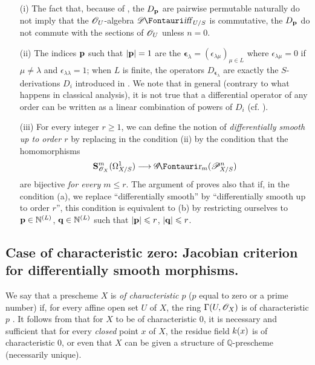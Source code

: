 \begin{remarks}[16.11.3]
\label{IV.16.11.3}
\begin{enumerate}
  \item[\rm{(i)}] The fact that, because of , the $D_\mathbf{p}$ are pairwise permutable naturally do not imply that the $\mathscr{O}_U$-algebra $\shDiff_{U/S}$ is commutative, the $D_\mathbf{p}$ do not commute with the sections of $\mathscr{O}_U$ unless $n = 0$.
  \item[\rm{(ii)}] The indices $\mathbf{p}$ such that $|\mathbf{p}| = 1$ are the $\pmb{\epsilon}_\lambda =  (\epsilon_{\lambda\mu})_{\mu \in L}$ where $\epsilon_{\lambda\mu} = 0$ if $\mu \neq \lambda$ and $\epsilon_{\lambda\lambda} = 1$;
  when $L$ is finite, the operators $D_{\pmb{\epsilon}_\lambda}$ are exactly the $S$-derivations $D_i$ introduced in .
  We note that in general (contrary to what happens in classical analysis), it is not true that a differential operator of any order can be written as a linear combination of powers of $D_i$ (cf. ). 
  \item[\rm{(iii)}] For every integer $r \geq 1$, we can define the notion of \emph{differentially smooth up to order $r$} by replacing in  the condition (ii) by the condition that the homomorphisms
  \[
    \bb{S}_{\sh{O}_X}^m(\Omega_{X/S}^1) \to \shGr_m(\sh{P}_{X/S}^n)
  \]
  are bijective \emph{for every $m \leq r$}.
  The argument of  proves also that if, in the condition (a), we replace ``differentially smooth'' by ``differentially smooth up to order $r$'', this condition is equivalent to (b) by restricting ourselves to $\mathbf{p} \in \mathbb{N}^{(L)}$, $\mathbf{q} \in \mathbb{N}^{(L)}$  such that $|\mathbf{p}| \leqslant r$, $|\mathbf{q}| \leqslant r$.
\end{enumerate}
\end{remarks}

\subsection{Case of characteristic zero: Jacobian criterion for differentially smooth morphisms.}
\label{IV.16.12}

\begin{env}[16.12.1]
\label{IV.16.12.1}
We say that a prescheme $X$ is \emph{of characteristic $p$} ($p$ equal to zero or a prime number) if, for every affine open set $U$ of $X$, the ring $\Gamma(U, \mathscr{O}_X)$ is of characteristic $p$ .
It follows from  that for $X$ to be of characteristic $0$, it is necessary and sufficient that for every \emph{closed} point $x$ of $X$, the residue field $k(x)$ is of characteristic $0$, or even that $X$ can be given a structure of $\mathbb{Q}$-prescheme (necessarily unique).
\end{env}

